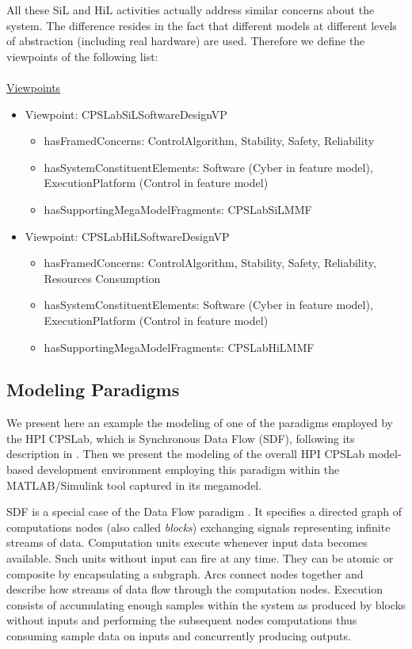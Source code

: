 All these SiL and HiL activities actually address similar concerns about the system. The difference resides in the fact that different models at different levels of abstraction (including real hardware) are used. Therefore we define the viewpoints of the following list:
\\
\\
\noindent\uline{Viewpoints}
    \begin{itemize}
         \item Viewpoint: CPSLabSiLSoftwareDesignVP
         \begin{itemize}
            \item hasFramedConcerns: ControlAlgorithm, Stability, Safety, Reliability
            \item hasSystemConstituentElements: Software (Cyber in feature model), ExecutionPlatform (Control in feature model)
            \item hasSupportingMegaModelFragments: CPSLabSiLMMF
         \end{itemize}
        \item Viewpoint: CPSLabHiLSoftwareDesignVP
         \begin{itemize}
            \item hasFramedConcerns: ControlAlgorithm, Stability, Safety, Reliability, Resources Consumption
            \item hasSystemConstituentElements: Software (Cyber in feature model), ExecutionPlatform (Control in feature model)
            \item hasSupportingMegaModelFragments: CPSLabHiLMMF
         \end{itemize}
    \end{itemize}

\subsection{Modeling Paradigms}
\label{sec:mpm4cps.example.paradigm}

We present here an example the modeling of one of the paradigms employed by the HPI CPSLab, which is Synchronous Data Flow (SDF), following its description in \cite{Amrani2020}. Then we present the modeling of the overall HPI CPSLab model-based development environment employing this paradigm within the MATLAB/Simulink tool captured in its megamodel.

SDF is a special case of the Data Flow paradigm \cite{J:Watson-Gurd:1982}. It specifies a  directed graph of computations nodes (also called \emph{blocks}) exchanging signals representing infinite streams of data. Computation units execute whenever input data becomes available. Such units without input can fire at any time. They can be atomic or composite by encapsulating a subgraph. Arcs connect nodes together and describe how streams of data flow through the computation nodes. Execution consists of accumulating enough samples within the system as produced by blocks without inputs and performing the subsequent nodes computations thus consuming sample data on inputs and concurrently producing outputs. 

